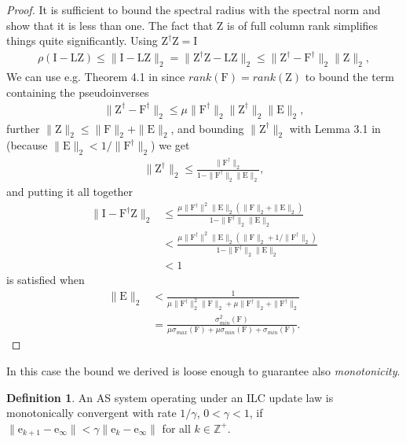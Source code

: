 \documentclass[10pt,a4paper]{article}
\theoremstyle{plain}
\theoremstyle{definition}
\newtheorem{defn}{Definition}[section]
\newcommand{\boldvec}[1]{\boldsymbol{\mathrm{#1}}}
\let\vec\boldvec
\newcommand{\error}{\vec{e}} %
\newcommand{\latentMat}{\vec{Z}} %
\newcommand{\errorMat}{\vec{E}} %
\newcommand{\lmatrix}{\vec{L}} %
\newcommand{\systemMat}{\vec{F}} %
\begin{document}
\begin{proof}
It is sufficient to bound the spectral radius with the spectral norm and show that it is less than one. The fact that $\latentMat$ is of full column rank simplifies things quite significantly. Using $\latentMat^{\dagger}\latentMat = \vec{I}$
%
\begin{align}
\rho(\vec{I} - \lmatrix\latentMat) \leq \|\vec{I} - \lmatrix\latentMat\|_2 = \|\latentMat^{\dagger}\latentMat - \lmatrix\latentMat\|_2\leq \|\latentMat^{\dagger} - \systemMat^{\dagger}\|_{2}\|\latentMat\|_2,
\end{align}
%
We can use e.g. Theorem 4.1 in \cite{Wedin73} since $rank(\systemMat) = rank(\latentMat)$ to bound the term containing the pseudoinverses
%
\begin{align}
\|\latentMat^{\dagger} - \systemMat^{\dagger}\|_{2} \leq \mu \|\systemMat^{\dagger}\|_2 \|\latentMat^{\dagger}\|_2 \|\errorMat\|_2,
\end{align}
%
further $\|\latentMat\|_2 \leq \|\systemMat\|_2 + \|\errorMat\|_2$, and bounding $\|\latentMat^{\dagger}\|_2$ with Lemma 3.1 in \cite{Wedin73} (because $\|\errorMat\|_2 < 1/\|\systemMat^{\dagger}\|_2$) we get
%
\begin{align}
\|\latentMat^{\dagger}\|_2 \leq \frac{\|\systemMat^{\dagger}\|_2}{1 - \|\systemMat^{\dagger}\|_2\|\errorMat\|_2}, 
\end{align}
%
and putting it all together
%
\begin{align}
\|\vec{I} - \systemMat^{\dagger}\latentMat\|_2 &\leq \frac{\mu \|\systemMat^{\dagger}\|^{2}\|\errorMat\|_2(\|\systemMat\|_2 + \|\errorMat\|_2)}{1 - \|\systemMat^{\dagger}\|_2\|\errorMat\|_2} \\
&<  \frac{\mu \|\systemMat^{\dagger}\|^{2}\|\errorMat\|_2(\|\systemMat\|_2 + 1/\|\systemMat^{\dagger}\|_2)}{1 - \|\systemMat^{\dagger}\|_2\|\errorMat\|_2} \\
&<1
\end{align}
%
is satisfied when 
%
\begin{align}
\|\errorMat\|_2 &< \frac{1}{\mu\|\systemMat^{\dagger}\|_2^{2}\|\systemMat\|_2 + \mu\|\systemMat^{\dagger}\|_2 + \|\systemMat^{\dagger}\|_2} \\
&= \frac{\sigma_{min}^{2}(\systemMat)}{\mu\sigma_{max}(\systemMat) + \mu\sigma_{min}(\systemMat) + \sigma_{min}(\systemMat)}.
\end{align}
\end{proof}
%
In this case the bound we derived is loose enough to guarantee also \emph{monotonicity}.
%
\begin{defn}
An AS system operating under an ILC update law is monotonically convergent with rate $1/\gamma$, $0 < \gamma < 1$, if $\|\error_{k+1} - \error_{\infty}\| < \gamma \|\error_{k} - \error_{\infty}\|$ for all $k \in \mathbb{Z}^{+}$.
\end{defn}
\end{document}
